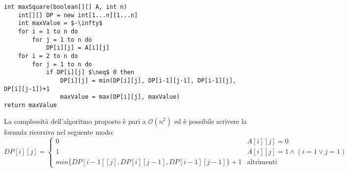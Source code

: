 \documentclass[../cheatSheetAlgoritmi.tex]{subfiles}
\begin{document}
\begin{lstlisting}[caption=Quadrato Binario]
int maxSquare(boolean[][] A, int n)
	int[][] DP = new int[1...n][1...n]
	int maxValue = $-\infty$
	for i = 1 to n do
		for j = 1 to n do
			DP[i][j] = A[i][j]
	for i = 2 to n do
		for j = 1 to n do
			if DP[i][j] $\neq$ 0 then
				DP[i][j] = min(DP[i][j], DP[i-1][j-1], DP[i-1][j], DP[i][j-1])+1
				maxValue = max(DP[i][j], maxValue)
return maxValue
\end{lstlisting}
La complessità dell'algoritmo proposto è pari a $\mathcal{O}(n^{2})$ ed è possibile scrivere la formula ricorsiva nel seguente modo:
\begin{equation*}
    DP[i][j]=\begin{cases}
        0 & \text{$A[i][j] = 0$}\\
        1 & \text{$A[i][j] = 1 \land (i = 1 \lor j = 1)$} \\
        min\{DP[i-1][j], DP[i][j-1], DP[i-1][j-1]\}+1 & \text{altrimenti}
    \end{cases}
\end{equation*}
\newpage
\end{document}
